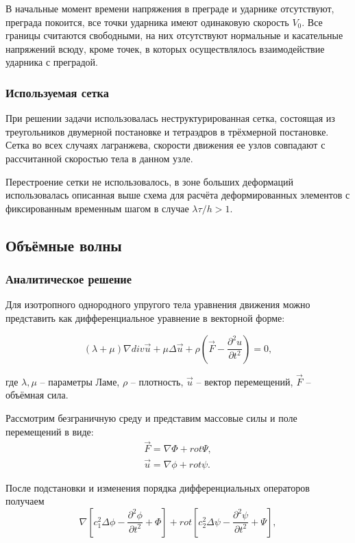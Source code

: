 В начальные момент времени напряжения в преграде и ударнике отсутствуют, преграда покоится, все точки ударника имеют одинаковую скорость $V_0$. Все границы считаются свободными, на них отсутствуют нормальные и касательные напряжений всюду, кроме точек, в которых осуществлялось взаимодействие ударника с преградой.

\subsubsection*{Используемая сетка}

При решении задачи использовалась неструктурированная сетка, состоящая из треугольников двумерной постановке и тетраэдров в трёхмерной постановке. Сетка во всех случаях лагранжева, скорости движения ее узлов совпадают с рассчитанной скоростью тела в данном узле.

Перестроение сетки не использовалось, в зоне больших деформаций использовалась описанная выше схема для расчёта деформированных элементов с фиксированным временным шагом в случае $\lambda \tau / h > 1$.


\subsection{Объёмные волны}

\subsubsection{Аналитическое решение}

Для изотропного однородного упругого тела уравнения движения можно представить как дифференциальное уравнение в векторной форме:

\begin{equation}
(\lambda+\mu)\nabla{div\vec{u}} + \mu\Delta\vec{u} + \rho(\vec{F}-\frac{\partial^2 u}{\partial t^2}) = 0,
\end{equation}

где $\lambda, \mu$ -- параметры Ламе, $\rho$ -- плотность, $\vec{u}$ -- вектор перемещений, $\vec{F}$ -- объёмная сила.

Рассмотрим безграничную среду и представим массовые силы и поле перемещений в виде:
\begin{eqnarray}
\vec{F} = \nabla\Phi + rot\Psi, \\
\vec{u} = \nabla\phi + rot\psi.
\end{eqnarray}

После подстановки и изменения порядка дифференциальных операторов получаем
\begin{equation}
\nabla[c_1^2\Delta\phi - \frac{\partial^2 \phi}{\partial t^2} + \Phi] + rot[c_2^2\Delta\psi - \frac{\partial^2 \psi}{\partial t^2} + \Psi],
\end{equation}

